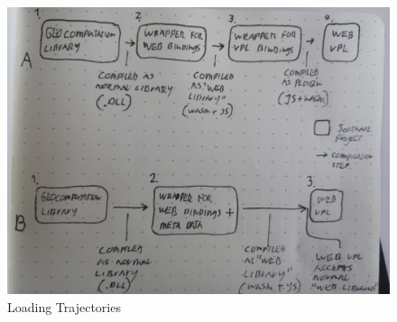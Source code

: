 \begin{figure}
  \centering
  \graphicspath{ {../../assets/images/4/} }
  \includegraphics[width=\linewidth]{loading-trajectory.png}
  \caption[Loading Trajectory]{Loading Trajectories}
  \label{fig:loading-trajectory}
\end{figure}


